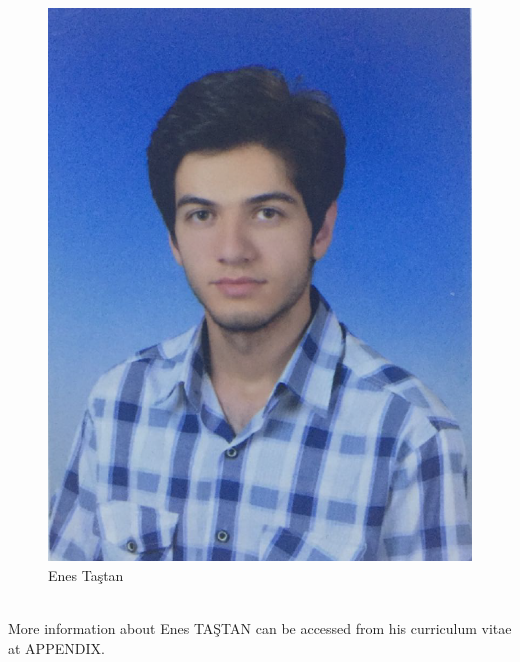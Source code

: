 \documentclass[a4paper,12pt]{article}
\begin{document}
\begin{minipage}{0.33\textwidth}
\begin{flushright} 

\begin{figure}[H]
	\center
	\setlength{\unitlength}{\textwidth} 
	\includegraphics[width=0.8\unitlength]{images/enes_foto}
	\caption{\label{fig:enes_foto} \small Enes Taştan }
\end{figure}

\end{flushright}
\end{minipage}\\[0.4cm]

More information about Enes TAŞTAN can be accessed from his curriculum vitae at APPENDIX.\\[0.4cm]

\end{document}
